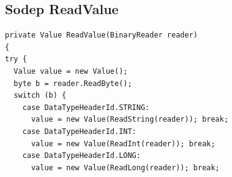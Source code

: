 \documentclass[12pt,a4paper]{article}
\begin{document}
\newpage
\begin{appendices}
\section{Sodep ReadValue}\label{app:ReadValue}
\begin{lstlisting}[caption={Sodep ReadValue method},label={lst:sodepReadValue}]
private Value ReadValue(BinaryReader reader)                                                                                                                                                         
{                                                                                                                                                                                                    
try {                                                                                                                                                                                                
  Value value = new Value();                                                                                                                                                                   
  byte b = reader.ReadByte();                                                                                                                                                                  
  switch (b) {                                                                                                                                                                                            
    case DataTypeHeaderId.STRING:                                                                                                                                                            
      value = new Value(ReadString(reader)); break;                                                                                                                                                                               
    case DataTypeHeaderId.INT:                                                                                                                                                               
      value = new Value(ReadInt(reader)); break;                                                                                                                                                  
    case DataTypeHeaderId.LONG:                                                                                                                                                              
      value = new Value(ReadLong(reader)); break;                                                                                                                                                 

\end{lstlisting}
\end{appendices}
\end{document}
